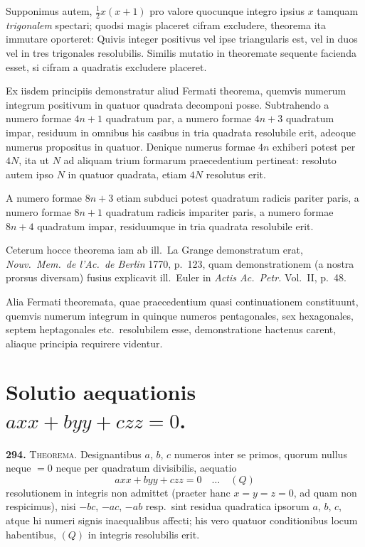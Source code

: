 \documentclass[12pt,a4paper]{article}
\theoremstyle{plain}
\theoremstyle{definition}
\theoremstyle{remark}
\begin{document}
Supponimus autem, $\tfrac{1}{2}x(x+1)$ pro valore quocunque integro ipsius $x$ tamquam \textit{trigonalem} spectari; quodsi magis placeret cifram excludere, theorema ita immutare oporteret: Quivis integer positivus vel ipse triangularis est, vel in duos vel in tres trigonales resolubilis. Similis mutatio in theoremate sequente facienda esset, si cifram a quadratis excludere placeret.

Ex iisdem principiis demonstratur aliud Fermati theorema, quemvis numerum integrum positivum in quatuor quadrata decomponi posse. Subtrahendo a numero formae $4n+1$ quadratum par, a numero formae $4n+3$ quadratum impar, residuum in omnibus his casibus in tria quadrata resolubile erit, adeoque numerus propositus in quatuor. Denique numerus formae $4n$ exhiberi potest per $4N$, ita ut $N$ ad aliquam trium formarum praecedentium pertineat: resoluto autem ipso $N$ in quatuor quadrata, etiam $4N$ resolutus erit.

A numero formae $8n+3$ etiam subduci potest quadratum radicis pariter paris, a numero formae $8n+1$ quadratum radicis impariter paris, a numero formae $8n+4$ quadratum impar, residuumque in tria quadrata resolubile erit.

Ceterum hocce theorema iam ab ill.~La Grange demonstratum erat, \textit{Nouv.~Mem.~de l'Ac.~de Berlin} 1770, p.~123, quam demonstrationem (a nostra prorsus diversam) fusius explicavit ill.~Euler in \textit{Actis Ac.~Petr.} Vol.~II, p.~48.

Alia Fermati theoremata, quae praecedentium quasi continuationem constituunt, quemvis numerum integrum in quinque numeros pentagonales, sex hexagonales, septem heptagonales etc.~resolubilem esse, demonstratione hactenus carent, aliaque principia requirere videntur.


\section*{Solutio aequationis $axx + byy + czz = 0$.}

\textbf{294.} \textsc{Theorema.} Designantibus $a$, $b$, $c$ numeros inter se primos, quorum nullus neque $= 0$ neque per quadratum divisibilis, aequatio
\[
axx + byy + czz = 0 \quad\ldots\quad (Q)
\]
resolutionem in integris non admittet (praeter hanc $x = y = z = 0$, ad quam non respicimus), nisi $-bc$, $-ac$, $-ab$ resp.~sint residua quadratica ipsorum $a$, $b$, $c$, atque hi numeri signis inaequalibus affecti; his vero quatuor conditionibus locum habentibus, $(Q)$ in integris resolubilis erit.
\end{document}
